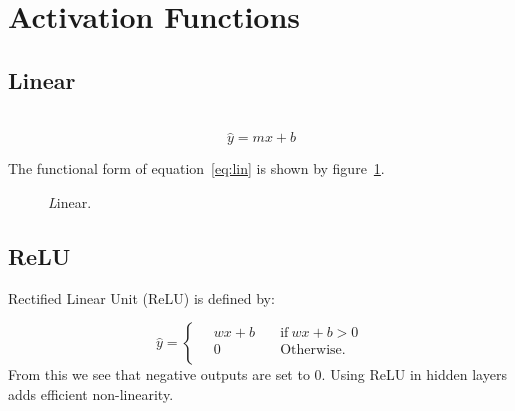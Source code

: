 \documentclass{article}
\numberwithin{equation}{subsection}
\begin{document}
\section{Activation Functions}\label{sec:actfunc}

\subsection{Linear}~\label{sec:lin}
\begin{equation}~\label{eq:lin}
  \hat{y} = mx + b
\end{equation}

The functional form of equation~\ref{eq:lin} is shown by figure~\ref{fig:lin}.
\begin{figure}[h!]
  \caption{\small{\textit Linear.}~\label{fig:lin}}
 \end{figure}

\subsection{ReLU}\label{sec:relu}
Rectified Linear Unit (ReLU) is defined by:  

\begin{equation}
\hat{y}=\begin{cases}
          \quad wx+b \quad &\text{if}~wx+b > 0 \\
          \quad 0 \quad &\text{Otherwise.}\\
     \end{cases}
  \end{equation}
From this we see that negative outputs are set to $0$.
Using ReLU in hidden layers adds efficient non-linearity.

\end{document}
